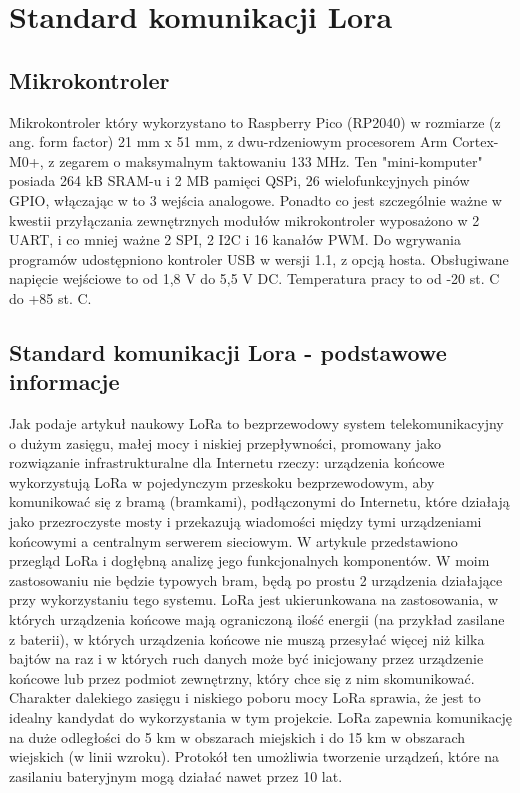 \chapter{Standard komunikacji Lora}

\section{Mikrokontroler}
Mikrokontroler który wykorzystano to Raspberry Pico (RP2040)\cite{pico2024} w rozmiarze (z ang. form factor) 21 mm x 51 mm, z dwu-rdzeniowym procesorem Arm Cortex-M0+, z zegarem o maksymalnym taktowaniu 133 MHz. Ten "mini-komputer" posiada 264 kB SRAM-u i 2 MB pamięci QSPi, 26 wielofunkcyjnych pinów GPIO, włączając w to 3 wejścia analogowe.
Ponadto co jest szczególnie ważne w kwestii przyłączania zewnętrznych modułów mikrokontroler wyposażono w 2 UART, i co mniej ważne 2 SPI, 2 I2C i 16 kanałów PWM.
Do wgrywania programów udostępniono kontroler USB w wersji 1.1, z opcją hosta.
Obsługiwane napięcie wejściowe to od 1,8 V do 5,5 V DC.
Temperatura pracy to od -20 st. C do +85 st. C.
\section{Standard komunikacji Lora - podstawowe informacje}
Jak podaje artykuł naukowy\cite{Augustin2016} LoRa to bezprzewodowy system telekomunikacyjny o dużym zasięgu, małej mocy i niskiej przepływności, promowany jako rozwiązanie infrastrukturalne dla Internetu rzeczy: urządzenia końcowe wykorzystują LoRa w pojedynczym przeskoku bezprzewodowym, aby komunikować się z bramą (bramkami), podłączonymi do Internetu, które działają jako przezroczyste mosty i przekazują wiadomości między tymi urządzeniami końcowymi a centralnym serwerem sieciowym. W artykule przedstawiono przegląd LoRa i dogłębną analizę jego funkcjonalnych komponentów.
W moim zastosowaniu nie będzie typowych bram, będą po prostu 2 urządzenia działające przy wykorzystaniu tego systemu.
LoRa jest ukierunkowana na zastosowania, w których urządzenia końcowe mają ograniczoną ilość energii (na przykład zasilane z baterii), w których urządzenia końcowe nie muszą przesyłać więcej niż kilka bajtów na raz i w których ruch danych może być inicjowany przez urządzenie końcowe lub przez podmiot zewnętrzny, który chce się z nim skomunikować. Charakter dalekiego zasięgu i niskiego poboru mocy LoRa sprawia, że jest to idealny kandydat do wykorzystania w tym projekcie.
LoRa zapewnia komunikację na duże odległości do 5 km w obszarach miejskich i do 15 km w obszarach wiejskich (w linii wzroku).
Protokół ten umożliwia tworzenie urządzeń, które na zasilaniu bateryjnym mogą działać nawet przez 10 lat.
